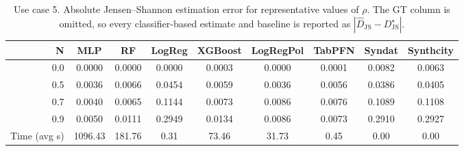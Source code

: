 \begin{table}[ht]
\centering
\small
\setlength{\tabcolsep}{3pt}
\caption{Use case 5. Absolute Jensen--Shannon estimation error for representative values of $\rho$. The GT column is omitted, so every classifier-based estimate and baseline is reported as $|\widehat{D}_{\mathrm{JS}} - D_{\mathrm{JS}}^{\star}|$.}
\label{tab:uc5_abs_error_no_gt}
\begin{tabular}{rcccccccc}
\toprule
N & MLP & RF & LogReg & XGBoost & LogRegPol & TabPFN & Syndat & Synthcity \\
\midrule
0.0 & 0.0000 & 0.0000 & 0.0000 & 0.0003 & 0.0000 & 0.0001 & 0.0082 & 0.0063 \\
0.5 & 0.0036 & 0.0066 & 0.0454 & 0.0059 & 0.0036 & 0.0056 & 0.0386 & 0.0405 \\
0.7 & 0.0040 & 0.0065 & 0.1144 & 0.0073 & 0.0086 & 0.0076 & 0.1089 & 0.1108 \\
0.9 & 0.0050 & 0.0111 & 0.2949 & 0.0134 & 0.0086 & 0.0073 & 0.2910 & 0.2927 \\
Time (avg s) & 1096.43 & 181.76 & 0.31 & 73.46 & 31.73 & 0.45 & 0.00 & 0.00 \\
\bottomrule
\end{tabular}
\end{table}